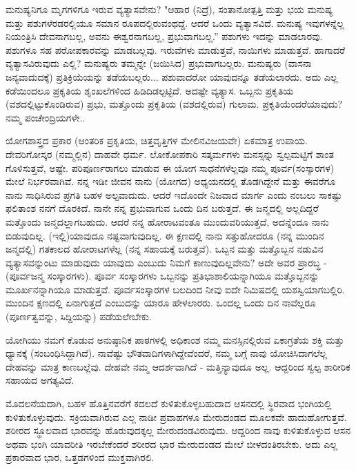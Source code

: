 ಮನುಷ್ಯನಿಗೂ ಮೃಗಗಳಿಗೂ ಇರುವ ವ್ಯತ್ಯಾಸವೇನು? "ಆಹಾರ (ನಿದ್ರೆ), ಸಂತಾನೋತ್ಪತ್ತಿ ಮತ್ತು ಭಯ ಮನುಷ್ಯ ಮತ್ತು ಪಶುಗಳೆರಡರಲ್ಲಿಯೂ ಸಮಾನ ರೂಪದಲ್ಲಿರುವಂಥದ್ದೆ. ಆದರೆ ಒಂದು ವ್ಯತ್ಯಾಸವಿದೆ. ಮನುಷ್ಯ ಇವುಗಳನ್ನೆಲ್ಲ ನಿಯಂತ್ರಿಸಿ ದೇವನಾಗಬಲ್ಲ, ಅವನು ಈಶ್ವರನಾಗಬಲ್ಲ, ಪ್ರಭುವಾಗಬಲ್ಲ.'' ಪಶುಗಳು ಇದನ್ನು ಮಾಡಲಾರವು. ಪಶುಗಳೂ ಸಹ ಪರೋಪಕಾರವನ್ನು ಮಾಡಬಲ್ಲವು. ಇರುವೆಗಳು ಮಾಡುತ್ತವೆ, ನಾಯಿಗಳು ಮಾಡುತ್ತವೆ. ಹಾಗಾದರೆ ವ್ಯತ್ಯಾಸವಿರುವುದು ಎಲ್ಲಿ? ಮನುಷ್ಯರು ತಮ್ಮನ್ನೇ (ಜಯಿಸಿದ) ಪ್ರಭುವಾಗಬಲ್ಲರು. ಮನುಷ್ಯರು (ವಾಸನಾ ಜನ್ಯವಾದುದಕ್ಕೆ) ಪ್ರತಿಕ್ರಿಯೆಯನ್ನು ತಡೆಯಬಲ್ಲರು... ಪಶುವಾದರೋ ಯಾವುದನ್ನೂ ತಡೆಯಲಾರದು. ಅದು ಎಲ್ಲ ಕಡೆಯಿಂದಲೂ ಪ್ರಕೃತಿಯ ಶೃಂಖಲೆಗಳಿಂದ ಹಿಡಿದಿಡಲ್ಪಟ್ಟಿದೆ. ಅದಷ್ಟೇ ವ್ಯತ್ಯಾಸ. ಒಬ್ಬನು ಪ್ರಕೃತಿಯ (ವಶದಲ್ಲಿಟ್ಟುಕೊಂಡಿರುವ) ಪ್ರಭು, ಮತ್ತೊಂದು ಪ್ರಕೃತಿಯ (ವಶದಲ್ಲಿರುವ) ಗುಲಾಮ. ಪ್ರಕೃತಿಯೆಂದರೆ\break ಯಾವುದು? ನಮ್ಮ ಪಂಚೇಂದ್ರಿಯಗಳೇ..

ಯೋಗಶಾಸ್ತ್ರದ ಪ್ರಕಾರ (ಆಂತರಿಕ ಪ್ರಕೃತಿಯ, ಚಿತ್ತವೃತ್ತಿಗಳ ಮೇಲಿನ\break ವಿಜಯವೇ) ಏಕಮಾತ್ರ ಉಪಾಯ. ದೇವರಿಗೋಸ್ಕರ (ನಮ್ಮಲ್ಲಿನ) ದಾಹವೇ ಧರ್ಮ. ಲೋಕೋಪಕಾರಿ ಸತ್ಕರ್ಮಗಳು ಮನಸ್ಸನ್ನು ಸ್ವಲ್ಪಮಟ್ಟಿಗೆ ಶಾಂತ ಗೊಳಿಸುತ್ತವೆ, ಅಷ್ಟೇ. ಪರಿಪೂರ್ಣರಾಗಲು ಮಾಡುವ ಈ ಯೋಗ ಸಾಧನೆಗಳೆಲ್ಲವೂ ನಮ್ಮ ಪೂರ್ವ\break (ಸಂಸ್ಕಾರಗಳ) ಮೇಲೆ ನಿರ್ಭರವಾಗಿವೆ. ನನ್ನ ಇಡೀ ಜೀವನ ನಾನು (ಯೋಗದ) ಅಧ್ಯಯನದಲ್ಲಿ ತೊಡಗಿದ್ದೇನೆ ಮತ್ತು ಈವರೆಗೂ ನಾನು ಸಾಧಿಸಿರುವ ಪ್ರಗತಿ ಬಹಳ ಅಲ್ಪವಾದುದು. ಆದರೆ ಇದೊಂದೇ ನಿಜವಾದ ಮಾರ್ಗ ಎಂದು ನಂಬಲು ಸಾಕಷ್ಟು ಫಲಿತಾಂಶ ನನಗೆ ದೊರಕಿದೆ. ನಾನೇ ನನ್ನ ಪ್ರಭುವಾಗುವ ಒಂದು ದಿನ ಬರುತ್ತದೆ. ಈ ಜನ್ಮದಲ್ಲಿ ಅಲ್ಲದಿದ್ದರೆ ಮತ್ತೊಂದು ಜನ್ಮದಲ್ಲಾಗಬಹುದು. ಆದರೆ ನನ್ನ ಹೋರಾಟವಂತೂ ಮುಂದುವರಿಯುತ್ತದೆ, ಅದನ್ನೆಂದೂ ನಾನು ಬಿಡುವುದಿಲ್ಲ. (ಇಲ್ಲಿ)\break ಯಾವುದೂ ನಷ್ಟವಾಗುವುದಿಲ್ಲ. ಈ ಕ್ಷಣದಲ್ಲಿ ನಾನು ಸತ್ತುಹೋದರೂ (ನನ್ನ ಮುಂದಿನ ಜನ್ಮದಲ್ಲಿ) ಗತಕಾಲದ ಹೋರಾಟಗಳೆಲ್ಲ (ನನ್ನ ಸಹಾಯಕ್ಕೆ ಬರುತ್ತವೆ). ಒಬ್ಬನ ಮತ್ತು ಮತ್ತೊಬ್ಬನ ನಡುವಿನ ವ್ಯತ್ಯಾಸವನ್ನುಂಟು ಮಾಡುವುದು ಯಾವುದು ಎಂಬುದು ನಿಮಗೆ ಕಾಣುವುದಿಲ್ಲವೇನು? ಅದೇ ಅವರ ಪ್ರಾರಬ್ಧ - (ಪೂರ್ವಜನ್ಮ ಸಂಸ್ಕಾರಗಳು). ಪೂರ್ವ ಸಂಸ್ಕಾರಗಳು ಒಬ್ಬನನ್ನು ಪ್ರತಿಭಾಶಾಲಿಯನ್ನಾಗಿಯೂ ಮತ್ತೊಬ್ಬನನ್ನು ಮೂರ್ಖನನ್ನಾಗಿಯೂ ಮಾಡುತ್ತವೆ. ಪೂರ್ವಸಂಸ್ಕಾರಗಳ ಬಲದಿಂದ ನೀವು ಐದೇ ನಿಮಿಷದಲ್ಲಿ ಯಶಸ್ವಿಯಾಗಬಲ್ಲಿರಿ. ಮುಂದಿನ ಕ್ಷಣದಲ್ಲಿ ಏನಾಗುತ್ತದೆ ಎಂಬುದನ್ನು ಯಾರೂ ಹೇಳಲಾರರು. ಒಂದಲ್ಲ ಒಂದು ದಿನ ನಾವೆಲ್ಲರೂ (ಪೂರ್ಣತ್ವವನ್ನು, ಸಿದ್ದಿಯನ್ನು) ಪಡೆಯಲೇಬೇಕು.

ಯೋಗಿಯು ನಮಗೆ ಕೊಡುವ ಅನುಷ್ಠಾನಿಕ ಪಾಠಗಳಲ್ಲಿ ಅಧಿಕಾಂಶ ನಮ್ಮ ಮನಸ್ಸಿನಲ್ಲಿರುವ ಏಕಾಗ್ರತೆಯ ಶಕ್ತಿ ಮತ್ತು ಧ್ಯಾನಕ್ಕೆ (ಸಂಬಂಧಿಸಿದ್ದಾಗಿದೆ). ನಾವೆಷ್ಟು ಭೌತವಾದಿಗಳಾಗಿದ್ದೇವೆಂದರೆ, ನಮ್ಮ ಬಗ್ಗೆ ನಾವು ಯೋಚಿಸಿದಾಗಲೆಲ್ಲ ದೇಹವನ್ನು ಮಾತ್ರ ಕಾಣಬಲ್ಲೆವು. ದೇಹವೇ ನಮ್ಮ ಆದರ್ಶವಾಗಿದೆ - ಮತ್ತಿನ್ಯಾವುದೂ ಅಲ್ಲ. ಆದ್ದರಿಂದ ಸ್ವಲ್ಪ ಶಾರೀರಿಕ ಸಹಾಯದ ಅಗತ್ಯವಿದೆ.

ಮೊದಲನೆಯದಾಗಿ, ಬಹಳ ಹೊತ್ತಿನವರೆಗೆ ಕದಲದೆ ಕುಳಿತುಕೊಳ್ಳಬಹುದಾದ ಆಸನದಲ್ಲಿ ಸ್ಥಿರವಾದ ಭಂಗಿಯಲ್ಲಿ ಕುಳಿತುಕೊಳ್ಳುವುದು. ಸಕ್ರಿಯವಾಗಿರುವ ಎಲ್ಲ ನಾಡೀ ಪ್ರವಾಹಗಳೂ ಮೇರುದಂಡದ ಮೂಲಕವೇ ಹಾದುಹೋಗುತ್ತವೆ. ಶರೀರದ ಸ್ಥೂಲವಾದ ಭಾರವನ್ನು ಹೊರುವುದಕ್ಕಲ್ಲ ಮೇರುದಂಡವಿರುವುದು. ಆದ್ದರಿಂದ ನಾವು ಕುಳಿತುಕೊಳ್ಳುವ ಆಸನ ಅಥವಾ ಭಂಗಿ ಯಾವರೀತಿ ಇರಬೇಕೆಂದರೆ ಶರೀರದ ಭಾರ ಮೇರುದಂಡದ ಮೇಲೆ ಬೀಳದಂತಿರಬೇಕು. ಅದು ಎಲ್ಲ ಪ್ರಕಾರವಾದ ಭಾರ, ಒತ್ತಡಗಳಿಂದ ಮುಕ್ತವಾಗಿರಲಿ.

